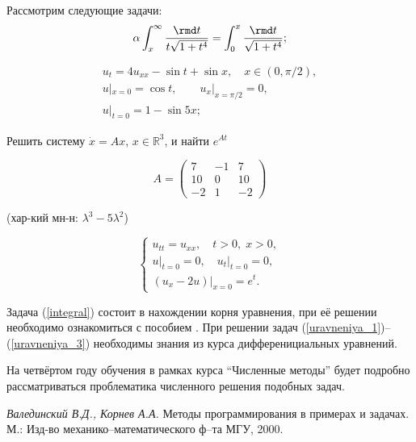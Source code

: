 \documentclass[12pt,english,russian]{article}
\begin{document}
Рассмотрим следующие задачи: 
\begin{equation}
	\label{integral}	
	\alpha \int_x^\infty \frac{\rmd t}{t\sqrt{1+t^4}} = \int_0^x \frac{\rmd t}{\sqrt{1+t^4}};
\end{equation}


\begin{equation}
		\label{uravneniya_1}
		\begin{array}{l}
			u_t=4u_{xx}-\sin t+\sin x,\quad x\in(0,\pi /2),\\
			u|_{x=0}=\cos t ,\qquad u_x|_{x=\pi /2}=0,\\
			u|_{t=0}=1-\sin{5x};
		\end{array}
	\end{equation}

Решить систему $\dot x=Ax$, $x\in\mathbb{R}^3$, и найти $e^{At}$
	
	\begin{equation}
		A=\begin{pmatrix}
			 7 & -1 & 7\\
		     10 & 0 & 10\\
			 -2 & 1 & -2
		  \end{pmatrix}
	\end{equation}
	
(хар-кий мн-н: $\lambda^3-5\lambda^2$)
	
	\begin{equation}
		\label{uravneniya_3}
		\begin{cases}
			u_{tt}=u_{xx},\quad t>0,\;x>0,\\
			u|_{t=0}=0,\quad {u_t|}_{t=0}=0,\\
			(u_{x}-2u)|_{x=0}=e^{t}.
		\end{cases}
	\end{equation}

Задача (\ref{integral}) состоит в нахождении корня уравнения, при её решении необходимо ознакомиться с пособием \cite{Valedinskiy}.
При решении задач (\ref{uravneniya_1})--(\ref{uravneniya_3}) необходимы знания из курса дифференициальных уравнений.

На четвёртом году обучения в рамках курса ``Численные методы''{} будет подробно рассматриваться проблематика численного решения подобных задач.


	\begin{thebibliography}{1}
		\emph {Валединский В.Д., Корнев А.А.} Методы программирования в примерах и задачах. М.: Изд-во механико--математического ф--та МГУ, 2000.
	\end{thebibliography}
\end{document}
